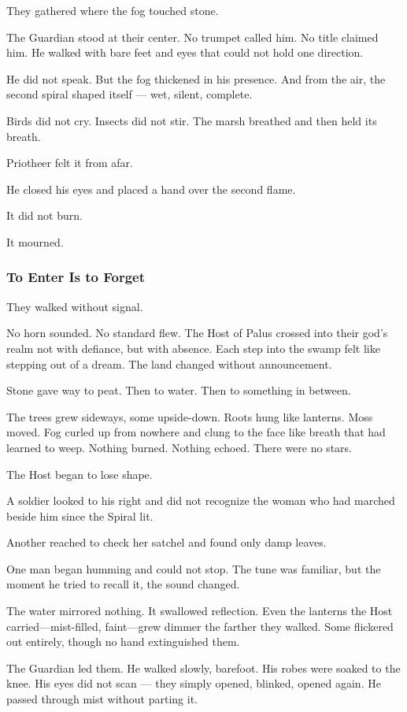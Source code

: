 \documentclass[12pt]{article}
\begin{document}
They gathered where the fog touched stone.

The Guardian stood at their center. No trumpet called him. No title claimed him. He walked with bare feet and eyes that could not hold one direction.

He did not speak. But the fog thickened in his presence. And from the air, the second spiral shaped itself — wet, silent, complete.

Birds did not cry. Insects did not stir. The marsh breathed and then held its breath.

Priotheer felt it from afar.

He closed his eyes and placed a hand over the second flame.

It did not burn.

It mourned.

\dotfill

\subsubsection{To Enter Is to Forget}

They walked without signal.

No horn sounded. No standard flew. The Host of Palus crossed into their god’s realm not with defiance, but with absence. Each step into the swamp felt like stepping out of a dream. The land changed without announcement.

Stone gave way to peat. Then to water. Then to something in between.

The trees grew sideways, some upside-down. Roots hung like lanterns. Moss moved. Fog curled up from nowhere and clung to the face like breath that had learned to weep. Nothing burned. Nothing echoed. There were no stars.

The Host began to lose shape.

A soldier looked to his right and did not recognize the woman who had marched beside him since the Spiral lit.

Another reached to check her satchel and found only damp leaves.

One man began humming and could not stop. The tune was familiar, but the moment he tried to recall it, the sound changed.

The water mirrored nothing. It swallowed reflection. Even the lanterns the Host carried—mist-filled, faint—grew dimmer the farther they walked. Some flickered out entirely, though no hand extinguished them.

The Guardian led them. He walked slowly, barefoot. His robes were soaked to the knee. His eyes did not scan — they simply opened, blinked, opened again. He passed through mist without parting it.
\end{document}
